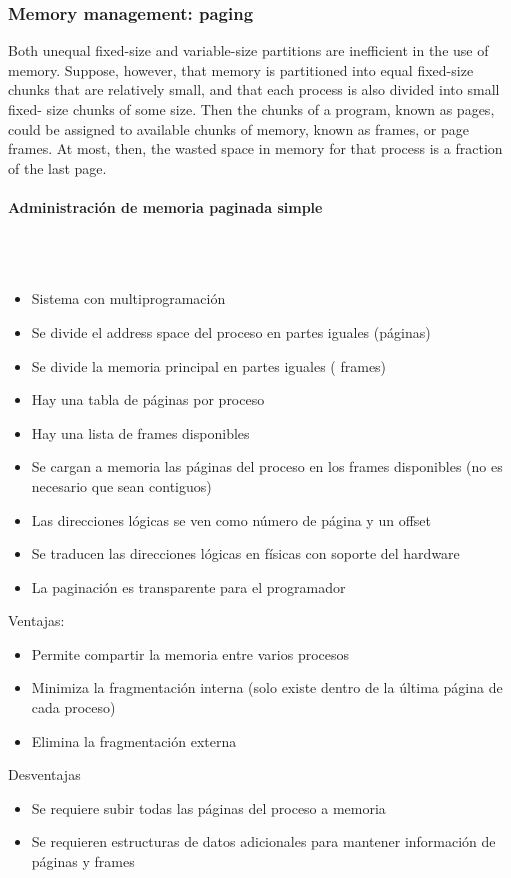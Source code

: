 \subsubsection{Memory management: paging}
Both unequal fixed-size and variable-size
partitions are inefficient in the use of memory.
Suppose, however, that memory is partitioned into equal fixed-size
chunks that are relatively small, and that each process is also divided into small fixed-
size chunks of some size. Then the chunks of a program, known as pages, could be assigned to
available chunks of memory, known as frames, or page frames. At most, then, the
wasted space in memory for that process is a fraction of the last page.

\paragraph{Administración de memoria paginada simple}\mbox{}\\\\%
\begin{itemize}
\item Sistema con multiprogramación
\item Se divide el address space del proceso en partes iguales (páginas)
\item Se divide la memoria principal en partes iguales ( frames)
\item Hay una tabla de páginas por proceso
\item Hay una lista de frames disponibles
\item Se cargan a memoria las páginas del proceso en los frames disponibles (no es necesario que sean contiguos)
\item Las direcciones lógicas se ven como número de página y un offset
\item Se traducen las direcciones lógicas en físicas con soporte del hardware
\item La paginación es transparente para el programador
\end{itemize}
Ventajas:
\begin{itemize}
\item Permite compartir la memoria entre varios procesos
\item Minimiza la fragmentación interna (solo existe dentro de la última página de cada proceso)
\item Elimina la fragmentación externa
\end{itemize}
Desventajas
\begin{itemize}
\item Se requiere subir todas las páginas del proceso a memoria
\item Se requieren estructuras de datos adicionales para mantener información de páginas y frames
\end{itemize}

